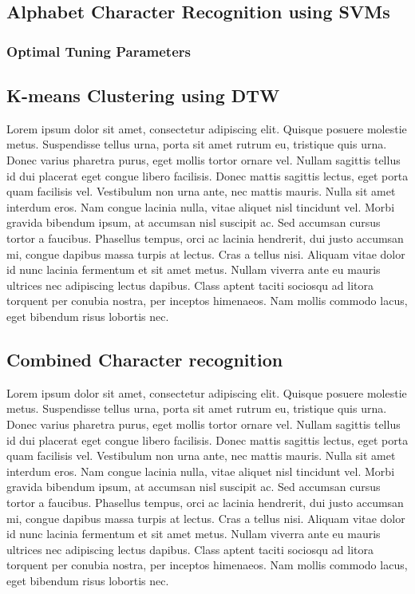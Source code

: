 \documentclass[12pt]{article}
\begin{document}
	\subsection{Alphabet Character Recognition using SVMs}
	\label{subsubsection:analysis:svm}
	
		\subsubsection{Optimal Tuning Parameters}
		\label{subsubsection:analysis:svm:params}
	
	\subsection{K-means Clustering using DTW}
	Lorem ipsum dolor sit amet, consectetur adipiscing elit. Quisque posuere molestie metus. Suspendisse tellus urna, porta sit amet rutrum eu, tristique quis urna. Donec varius pharetra purus, eget mollis tortor ornare vel. Nullam sagittis tellus id dui placerat eget congue libero facilisis. Donec mattis sagittis lectus, eget porta quam facilisis vel. Vestibulum non urna ante, nec mattis mauris. Nulla sit amet interdum eros. Nam congue lacinia nulla, vitae aliquet nisl tincidunt vel. Morbi gravida bibendum ipsum, at accumsan nisl suscipit ac. Sed accumsan cursus tortor a faucibus. Phasellus tempus, orci ac lacinia hendrerit, dui justo accumsan mi, congue dapibus massa turpis at lectus. Cras a tellus nisi. Aliquam vitae dolor id nunc lacinia fermentum et sit amet metus. Nullam viverra ante eu mauris ultrices nec adipiscing lectus dapibus. Class aptent taciti sociosqu ad litora torquent per conubia nostra, per inceptos himenaeos. Nam mollis commodo lacus, eget bibendum risus lobortis nec.
	
	\subsection{Combined Character recognition}
	Lorem ipsum dolor sit amet, consectetur adipiscing elit. Quisque posuere molestie metus. Suspendisse tellus urna, porta sit amet rutrum eu, tristique quis urna. Donec varius pharetra purus, eget mollis tortor ornare vel. Nullam sagittis tellus id dui placerat eget congue libero facilisis. Donec mattis sagittis lectus, eget porta quam facilisis vel. Vestibulum non urna ante, nec mattis mauris. Nulla sit amet interdum eros. Nam congue lacinia nulla, vitae aliquet nisl tincidunt vel. Morbi gravida bibendum ipsum, at accumsan nisl suscipit ac. Sed accumsan cursus tortor a faucibus. Phasellus tempus, orci ac lacinia hendrerit, dui justo accumsan mi, congue dapibus massa turpis at lectus. Cras a tellus nisi. Aliquam vitae dolor id nunc lacinia fermentum et sit amet metus. Nullam viverra ante eu mauris ultrices nec adipiscing lectus dapibus. Class aptent taciti sociosqu ad litora torquent per conubia nostra, per inceptos himenaeos. Nam mollis commodo lacus, eget bibendum risus lobortis nec.
	
\end{document}
